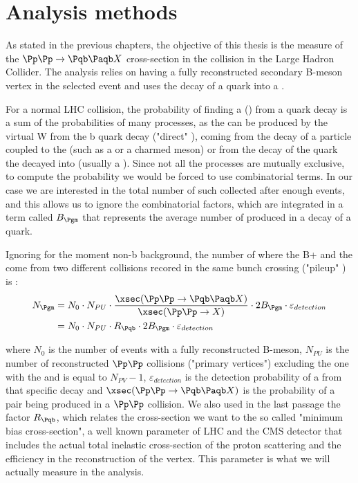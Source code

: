 \section{Analysis methods}
\label{sec:method}

As stated in the previous chapters, the objective of this thesis is the measure of the $\Pp\Pp \to \Pqb \Paqb X$ cross-section in the collision in the Large Hadron Collider.
The analysis relies on having a fully reconstructed secondary B-meson vertex in the selected event and uses the decay of a \Pqb quark into a \Pgm.

For a normal LHC collision, the probability of finding a \Pgm (\Pgm) from a \Pqb quark decay is a sum of the probabilities of many processes, as the \Pgm can be produced by the virtual W from the b quark decay ("direct" \Pgm), coming from the decay of a particle coupled to the \PW (such as a \Pgt or a charmed meson) or from the decay of the quark the \Pqb decayed into (usually a \Pqc).
Since not all the processes are mutually exclusive, to compute the probability we would be forced to use combinatorial terms.
In our case we are interested in the total number of such \Pgm collected after enough events, and this allows us to ignore the combinatorial factors, which are integrated in a term called $B_{\Pgm}$ that represents the average number of \Pgm produced in a decay of a \Pqb quark.

Ignoring for the moment non-b background, the number of \Pgm where the B+ and the \Pgm come from two different collisions recored in the same bunch crossing ("pileup" \Pgm) is :
\begin{equation}
	\begin{split}
	N_{\Pgm}&=N_0\cdot N_{PU}\cdot\frac{\xsec(\Pp\Pp \to \Pqb \Paqb X)}{\xsec(\Pp\Pp \to X)}\cdot 2B_{\Pgm}\cdot\varepsilon_{detection} \\
	&=N_0\cdot N_{PU}\cdot R_{\Pqb}\cdot 2B_{\Pgm}\cdot\varepsilon_{detection}
	\end{split}
	\label{eq:xsec-pil}
\end{equation}

where $N_0$ is the number of events with a fully reconstructed B-meson, $N_{PU}$ is the number of reconstructed $\Pp\Pp$ collisions ("primary vertices") excluding the one with the \PBp and is equal to $N_{PV}-1$, $\varepsilon_{detection}$ is the detection probability of a \Pgm from that specific decay and $\xsec(\Pp\Pp\to\Pqb\Paqb X)$ is the probability of a \Pqb\Paqb pair being produced in a $\Pp\Pp$ collision. 
We also used in the last passage the factor $R_{\Pqb}$, which relates the cross-section we want to the so called "minimum bias cross-section", a well known parameter of LHC and the CMS detector that includes the actual total inelastic cross-section of the proton scattering and the efficiency in the reconstruction of the vertex.
This parameter is what we will actually measure in the analysis.

